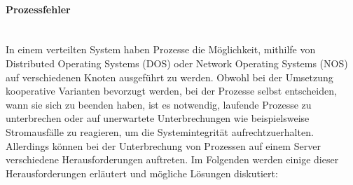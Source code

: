 \documentclass[../vs-script-first-v01.tex]{subfiles}
\begin{document}
\paragraph{Prozessfehler\\\\}
In einem verteilten System haben Prozesse die Möglichkeit, mithilfe von Distributed Operating Systems (DOS) oder Network Operating Systems (NOS) auf verschiedenen Knoten ausgeführt zu werden. Obwohl bei der Umsetzung  kooperative Varianten bevorzugt werden, bei der Prozesse selbst entscheiden, wann sie sich zu beenden haben, ist es notwendig, laufende Prozesse zu unterbrechen oder auf unerwartete Unterbrechungen wie beispielsweise Stromausfälle zu reagieren, um die Systemintegrität aufrechtzuerhalten. Allerdings können bei der Unterbrechung von Prozessen auf einem Server verschiedene Herausforderungen auftreten. Im Folgenden werden einige dieser Herausforderungen erläutert und mögliche Lösungen diskutiert:
\end{document}
